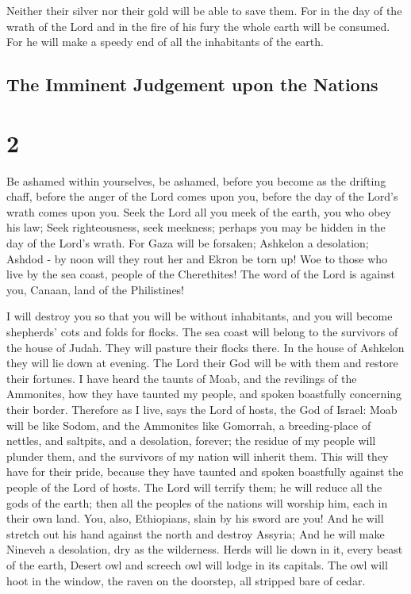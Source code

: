 Neither their silver nor their gold will be able to save
them. For in the day of the wrath of the Lord and in the fire of his
fury the whole earth will be consumed. For he will make a speedy end of
all the inhabitants of the earth.

\hypertarget{the-imminent-judgement-upon-the-nations}{%
\subsection{The Imminent Judgement upon the
Nations}\label{the-imminent-judgement-upon-the-nations}}

\hypertarget{section-1}{%
\section{2}\label{section-1}}

 Be ashamed within yourselves, be ashamed, 
before you become as the drifting chaff, before the anger of the Lord
comes upon you, before the day of the Lord's wrath comes upon you.
 Seek the Lord all you meek of the earth, you who obey his
law; Seek righteousness, seek meekness; perhaps you may be hidden in the
day of the Lord's wrath.  For Gaza will be forsaken;
Ashkelon a desolation; Ashdod - by noon will they rout her and Ekron be
torn up!  Woe to those who live by the sea coast, people of
the Cherethites! The word of the Lord is against you, Canaan, land of
the Philistines!

I will destroy you so that you will be without inhabitants, 
and you will become shepherds' cots and folds for flocks. 
The sea coast will belong to the survivors of the house of Judah. They
will pasture their flocks there. In the house of Ashkelon they will lie
down at evening. The Lord their God will be with them and restore their
fortunes.  I have heard the taunts of Moab, and the
revilings of the Ammonites, how they have taunted my people, and spoken
boastfully concerning their border.  Therefore as I live,
says the Lord of hosts, the God of Israel: Moab will be like Sodom, and
the Ammonites like Gomorrah, a breeding-place of nettles, and saltpits,
and a desolation, forever; the residue of my people will plunder them,
and the survivors of my nation will inherit them.  This
will they have for their pride, because they have taunted and spoken
boastfully against the people of the Lord of hosts.  The
Lord will terrify them; he will reduce all the gods of the earth; then
all the peoples of the nations will worship him, each in their own land.
 You, also, Ethiopians, slain by his sword are you!
 And he will stretch out his hand against the north and
destroy Assyria; And he will make Nineveh a desolation, dry as the
wilderness.  Herds will lie down in it, every beast of the
earth, Desert owl and screech owl will lodge in its capitals. The owl
will hoot in the window, the raven on the doorstep, all stripped bare of
cedar.

